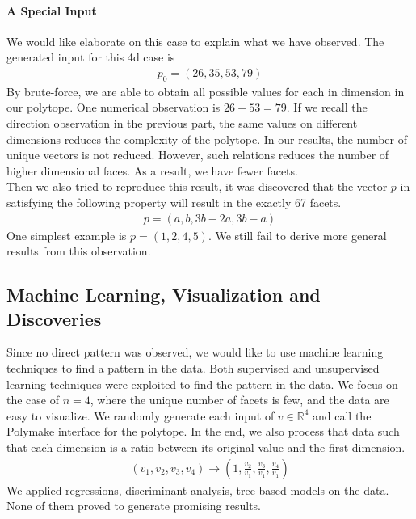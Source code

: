 \documentclass[12pt,letterpaper]{article}
\newcommand*{\R}{\mathbb{R}}
\begin{document}
\paragraph{A Special Input}
We would like elaborate on this case to explain what we have observed.
The generated input for this 4d case is
\begin{align*}
    p_0 = (26, 35, 53, 79)
\end{align*}
By brute-force, we are able to obtain all possible values for each in dimension in 
our polytope. One numerical observation is $26+53 = 79$. If we recall 
the direction observation in the previous part, the same values on different dimensions 
reduces the complexity of the polytope. In our results, the number of unique vectors is not reduced.
However, such relations reduces the number of higher dimensional faces. 
As a result, we have fewer facets.\\
Then we also tried to reproduce this result, it was discovered that the vector $p$ 
in satisfying the following property will result in the exactly 67 facets.
\begin{align*}
    p = (a, b, 3b - 2a, 3b - a)
\end{align*}
One simplest example is $p = (1, 2, 4, 5)$. 
We still fail to derive more general results from this observation.


\subsection{Machine Learning, Visualization and Discoveries}
Since no direct pattern was observed, we would like to use machine learning techniques to find a pattern in the data.
Both supervised and unsupervised learning techniques were exploited to find the pattern in the data. 
We focus on the case of $n = 4$, where the unique number of facets is few, and the data are easy to visualize.
We randomly generate each input of $v \in \R^4$ and call the Polymake interface for the polytope. In the end, 
we also process that data such that each dimension is a ratio between its original value and the first dimension. 
\begin{align*}
 (v_1, v_2, v_3, v_4) \rightarrow \left(1, \frac{v_2}{v_1}, \frac{v_3}{v_1}, \frac{v_4}{v_1} \right)
\end{align*}
We applied regressions, discriminant analysis, tree-based models on the data. 
None of them proved to generate promising results. \\\\
\end{document}
